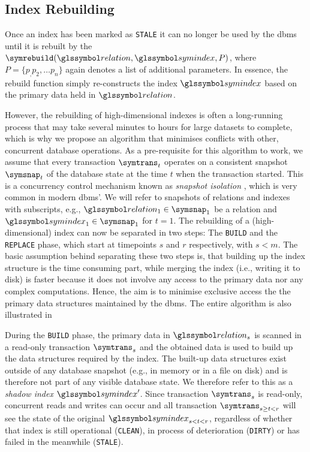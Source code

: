 \subsection{Index Rebuilding}

Once an index has been marked as \texttt{STALE} it can no longer be used by the \acrshort{dbms} until it is rebuilt by the $\symrebuild(\relation,\symindex,P)$, where $P = \{ p_, p_2, \ldots p_n \}$ again denotes a list of additional parameters. In essence, the rebuild function simply re-constructs the index $\symindex$ based on the primary data held in $\relation$.

However, the rebuilding of high-dimensional indexes is often a long-running process that may take several minutes to hours for large datasets to complete, which is why we propose an algorithm that minimises conflicts with other, concurrent database operations. As a pre-requisite for this algorithm to work, we assume that every transaction $\symtrans_t$ operates on a consistent snapshot $\symsnap_t$ of the database state at the time $t$ when the transaction started. This is a concurrency control mechanism known as \emph{snapshot isolation} \cite{Berenson:1995Critique}, which is very common in modern \acrshort{dbms}'. We will refer to snapshots of relations and indexes with subscripts, e.g.,  $\relation_{1} \in \symsnap_1$ be a relation and $\symindex_{1 } \in \symsnap_1$ for $t=1$. The rebuilding of a (high-dimensional) index can now be separated in two steps: The \texttt{BUILD} and the \texttt{REPLACE} phase, which start at timepoints $s$ and $r$ respectively, with $s < m$. The basic assumption behind separating these two steps is, that building up the index structure is the time consuming part, while merging the index (i.e., writing it to disk) is faster because it does not involve any access to the primary data nor any complex computations. Hence, the aim is to minimise exclusive access the the primary data structures maintained by the \acrshort{dbms}. The entire algorithm is also illustrated in 

During the \texttt{BUILD} phase, the primary data in $\relation_{s}$ is scanned in a read-only transaction $\symtrans_{s}$ and the obtained data is used to build up the data structures required by the index. The built-up data structures exist outside of any database snapshot (e.g., in memory or in a file on disk) and is therefore not part of any visible database state. We therefore refer to this as a \emph{shadow index} $\symindex^{\prime}$. Since transaction $\symtrans_{s}$ is read-only, concurrent reads and writes can occur and all transaction $\symtrans_{s \geq t < r}$ will see the state of the original $\symindex_{s < t < r}$, regardless of whether that index is still operational (\texttt{CLEAN}), in process of deterioration (\texttt{DIRTY}) or has failed in the meanwhile (\texttt{STALE}). 

